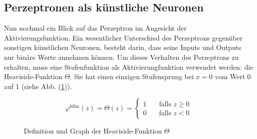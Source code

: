 \subsection{Perzeptronen als künstliche Neuronen}
Nun nochmal ein Blick auf das Perzeptron im Angesicht der Aktivierungsfunktion.
Ein wesentlicher Unterschied des Perzeptrons gegenüber sonstigen künstlichen
Neuronen, besteht darin, dass seine Inputs und Outputs nur binäre Werte
annehmen können. Um dieses Verhalten des Perzeptrons zu erhalten,
muss eine Stufenfunktion als Aktivierungfunktion verwendet werden: die Heaviside-Funktion $\Theta$.
Sie hat einen einzigen Stufensprung bei $x=0$ vom Wert 0 auf 1 (siehe Abb. (\ref{fig:heaviside})).
\\
\begin{figure}[h!]
  \begin{minipage}[h!]{0.5\textwidth}
    \begin{equation*}
      \varphi^{\text{hlim}}(z) = \Theta(z) =
      \begin{cases}
        1 & \quad \text{falls } z \geq 0\\
        0 & \quad \text{falls } z < 0
      \end{cases}
    \end{equation*}
  \end{minipage}
  \begin{minipage}[h!]{0.5\textwidth}
    \centering
  \end{minipage}
  \caption{Definition und Graph der Heaviside-Funktion $\Theta$}
  \label{fig:heaviside}
\end{figure}

